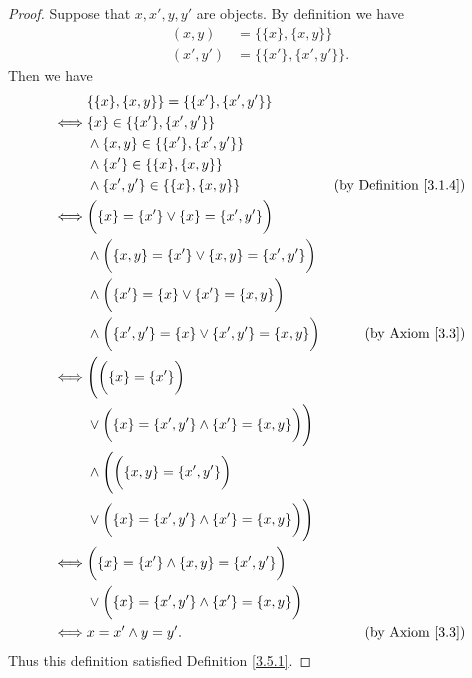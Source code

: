 \begin{proof}
    Suppose that \(x, x', y, y'\) are objects.
    By definition we have
    \begin{align*}
        (x, y)   & = \{\{x\}, \{x, y\}\}     \\
        (x', y') & = \{\{x'\}, \{x', y'\}\}.
    \end{align*}
    Then we have
    \begin{align*}
             & \{\{x\}, \{x, y\}\} = \{\{x'\}, \{x', y'\}\}                                                           \\
        \iff & \{x\} \in \{\{x'\}, \{x', y'\}\}                                                                       \\
             & \land \{x, y\} \in \{\{x'\}, \{x', y'\}\}                                                              \\
             & \land \{x'\} \in \{\{x\}, \{x, y\}\}                                                                   \\
             & \land \{x', y'\} \in \{\{x\}, \{x, y\}\}                          & \text{(by Definition \ref{3.1.4})} \\
        \iff & \bigg(\{x\} = \{x'\} \lor \{x\} = \{x', y'\}\bigg)                                                     \\
             & \land \bigg(\{x, y\} = \{x'\} \lor \{x, y\} = \{x', y'\}\bigg)                                         \\
             & \land \bigg(\{x'\} = \{x\} \lor \{x'\} = \{x, y\}\bigg)                                                \\
             & \land \bigg(\{x', y'\} = \{x\} \lor \{x', y'\} = \{x, y\}\bigg)   & \text{(by Axiom \ref{3.3})}        \\
        \iff & \Bigg(\bigg(\{x\} = \{x'\}\bigg)                                                                       \\
             & \lor \bigg(\{x\} = \{x', y'\} \land \{x'\} = \{x, y\}\bigg)\Bigg)                                      \\
             & \land \Bigg(\bigg(\{x, y\} = \{x', y'\}\bigg)                                                          \\
             & \lor \bigg(\{x\} = \{x', y'\} \land \{x'\} = \{x, y\}\bigg)\Bigg)                                      \\
        \iff & \bigg(\{x\} = \{x'\} \land \{x, y\} = \{x', y'\}\bigg)                                                 \\
             & \lor \bigg(\{x\} = \{x', y'\} \land \{x'\} = \{x, y\}\bigg)                                            \\
        \iff & x = x' \land y = y'.                                              & \text{(by Axiom \ref{3.3})}
    \end{align*}
    Thus this definition satisfied Definition \ref{3.5.1}.


\end{proof}
